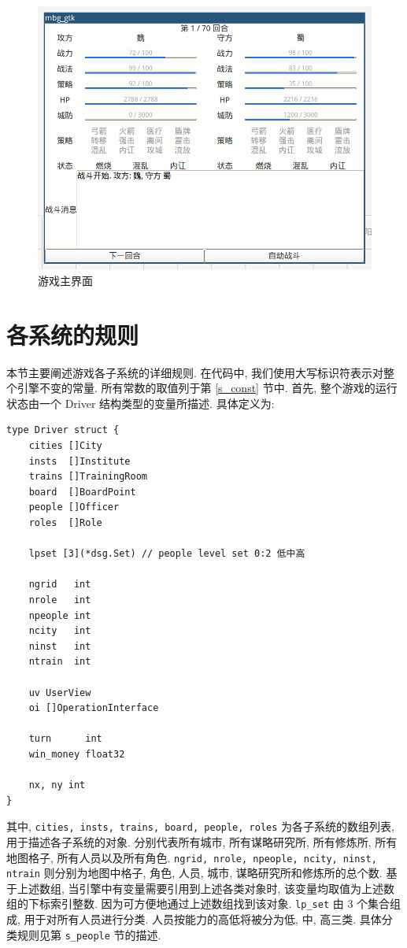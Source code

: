 \documentclass[UTF8, zihao=-4]{ctexart} %
\newcommand{\lcode}{\lstinline} % 段内插入代码
\begin{document}
\begin{figure}
    \centering
    \includegraphics[scale=0.4]{f_battle.png}
    \caption{\label{f_battle_res}游戏主界面}
\end{figure}

\section{各系统的规则}
\label{s_driver}
本节主要阐述游戏各子系统的详细规则. 在代码中, 我们使用大写标识符表示对整个引擎不变的常量.
所有常数的取值列于第 \ref{s_const} 节中.
首先, 整个游戏的运行状态由一个 Driver 结构类型的变量所描述. 具体定义为:
\begin{lstlisting}
type Driver struct {
	cities []City
	insts  []Institute
	trains []TrainingRoom
	board  []BoardPoint
	people []Officer
	roles  []Role

	lpset [3](*dsg.Set) // people level set 0:2 低中高

	ngrid   int
	nrole   int
	npeople int
	ncity   int
	ninst   int
	ntrain  int

	uv UserView
	oi []OperationInterface

	turn      int
	win_money float32

	nx, ny int
}
\end{lstlisting}
其中, \lcode{cities, insts, trains, board, people, roles} 为各子系统的数组列表, 用于描述各子系统的对象. 
分别代表所有城市, 所有谋略研究所, 所有修炼所, 所有地图格子, 所有人员以及所有角色.
\lcode{ngrid, nrole, npeople, ncity, ninst, ntrain} 则分别为地图中格子, 角色, 人员, 城市, 谋略研究所和修炼所的总个数.
基于上述数组, 当引擎中有变量需要引用到上述各类对象时, 该变量均取值为上述数组的下标索引整数. 因为可方便地通过上述数组找到该对象.
\lcode{lp_set} 由 $3$ 个集合组成, 用于对所有人员进行分类. 人员按能力的高低将被分为低, 中, 高三类.
具体分类规则见第 \lcode{s_people} 节的描述.
\end{document}
